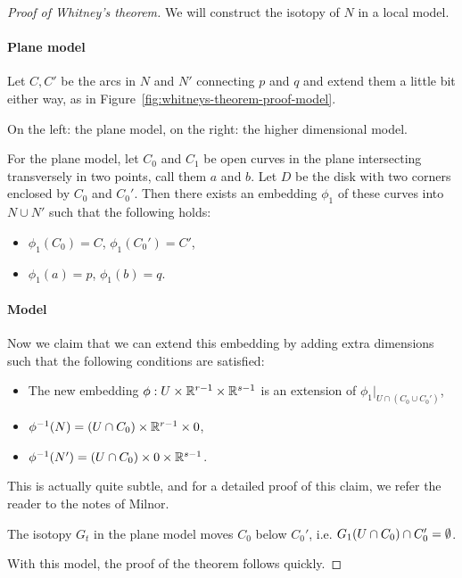 \begin{proof}[Proof of Whitney's theorem]
    We will construct the isotopy of $N$ in a local model.
    \paragraph{Plane model}
    Let $C, C'$ be the arcs in  $N$ and $N'$ connecting $p$ and  $q$ and extend them a little bit either way, as in Figure~\ref{fig:whitneys-theorem-proof-model}.
    \begin{marginfigure}
        \center
        \caption{On the left: the plane model, on the right: the higher dimensional model.}
        \label{fig:whitneys-theorem-proof-model}
    \end{marginfigure}
    For the plane model, let $C_0$ and $ C_1$ be open curves in the plane intersecting transversely in two points, call them $a$ and $b$.
    Let $D$ be the disk with two corners enclosed by $C_0$ and $C_0'$.
    Then there exists an embedding $\phi_1$ of these curves into $N \cup N'$ such that the following holds:
     \begin{itemize}
         \item $\phi_1(C_0) = C$, $\phi_1(C_0') = C'$,
         \item $\phi_1(a) = p$, $\phi_1(b) = q$.
    \end{itemize}
    \paragraph{Model}
    Now we claim that we can extend this embedding by adding extra dimensions such that the following conditions are satisfied:
    \begin{itemize}
        \item The new embedding $\phi: U \times \mathbb{R}^{r-1} \times \mathbb{R}^{s-1}$ is an extension of $\phi_1|_{U \cap (C_0 \cup C_0')}$,
        \item $\phi^{-1}(N) = (U \cap C_0) \times \mathbb{R}^{r-1} \times 0$,
            \item $\phi^{-1}(N') = (U \cap C_0) \times 0\times \mathbb{R}^{s-1}$.
    \end{itemize}
    This is actually quite subtle, and for a detailed proof of this claim, we refer the reader to the notes of Milnor.
    \begin{marginfigure}
        \centering
        \caption{The isotopy $G_t$ in the plane model moves $C_0$ below $ C_0'$, i.e. $ G_1(U \cap C_0) \cap C_0' = \emptyset$.}
        \label{fig:whitneys-theorem-model-isotopy}
    \end{marginfigure}
    With this model, the proof of the theorem follows quickly.

\end{proof}
